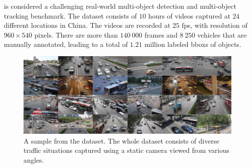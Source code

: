  is considered a challenging real-world multi-object detection and multi-object tracking benchmark. The dataset consists of $10$ hours of videos captured at $24$ different locations in China. The videos are recorded at $25$ \gls{fps}, with resolution of $960 \times 540$ pixels. There are more than $140\ 000$ frames and $8\ 250$ vehicles that are manually annotated, leading to a total of $1.21$ million labeled \glspl{bbox} of objects.

\begin{figure}[t]
    \centerline{\includegraphics[width=\linewidth]{figures/datasets/uadetrac_samples.jpg}}
    \caption[ dataset]{A sample from the  dataset. The whole dataset consists of diverse traffic situations captured using a static camera viewed from various angles. }
    \label{fig:DatasetUADETRAC}
\end{figure}

\def\uadetracfigsize{0.4}

